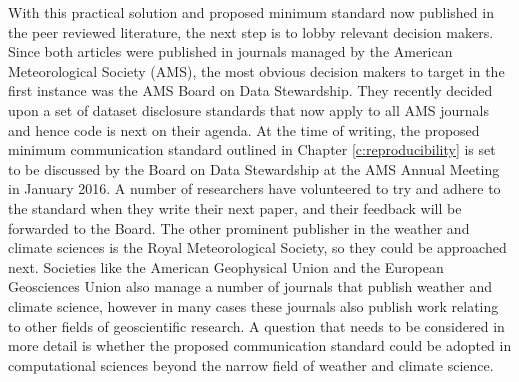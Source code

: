 With this practical solution \citep{IrvingSimmonds2015} and proposed minimum standard \citep{IrvingBAMS2016} now published in the peer reviewed literature, the next step is to lobby relevant decision makers. Since both articles were published in journals managed by the American Meteorological Society (AMS), the most obvious decision makers to target in the first instance was the AMS Board on Data Stewardship. They recently decided upon a set of dataset disclosure standards that now apply to all AMS journals \citep{Mayernik2015} and hence code is next on their agenda. At the time of writing, the proposed minimum communication standard outlined in Chapter \ref{c:reproducibility} is set to be discussed by the Board on Data Stewardship at the AMS Annual Meeting in January 2016. A number of researchers have volunteered to try and adhere to the standard when they write their next paper, and their feedback will be forwarded to the Board. The other prominent publisher in the weather and climate sciences is the Royal Meteorological Society, so they could be approached next. Societies like the American Geophysical Union and the European Geosciences Union also manage a number of journals that publish weather and climate science, however in many cases these journals also publish work relating to other fields of geoscientific research. A question that needs to be considered in more detail is whether the proposed communication standard could be adopted in computational sciences beyond the narrow field of weather and climate science.

